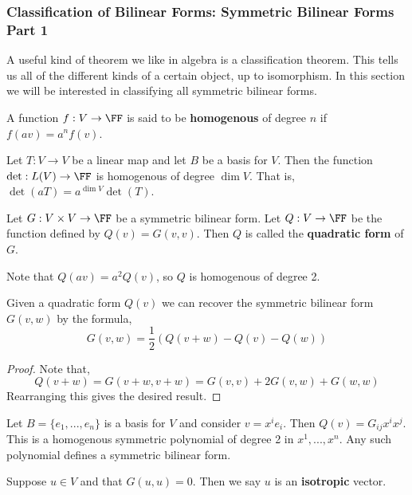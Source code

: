 \subsubsection{Classification of Bilinear Forms: Symmetric Bilinear Forms Part 1}
A useful kind of theorem we like in algebra is a classification theorem. This tells us all of the different kinds of a certain object, up to isomorphism. In this section we will be interested in classifying all symmetric bilinear forms.
\begin{defn}A function $f : V \to \FF$ is said to be \textbf{homogenous} of degree $n$ if $f(av) = a^n f(v)$.
\end{defn}
\begin{remark*}
    Let $T:V\to V$ be a linear map and let $B$ be a basis for $V$. Then the function $\det : L(V) \to \FF$ is homogenous of degree $\dim V$. That is, $\det (aT) = a^{\dim V} \det(T)$. 
\end{remark*}
\begin{defn}
    Let $G :V\times V \to \FF$ be a symmetric bilinear form. Let $Q : V\to \FF$ be the function defined by $Q(v) = G(v,v)$. Then $Q$ is called the \textbf{quadratic form} of $G$.
\end{defn}
\begin{remark*}
    Note that $Q(av) = a^2 Q(v)$, so $Q$ is homogenous of degree 2.
\end{remark*}

\begin{thm}
    Given a quadratic form $Q(v)$ we can recover the symmetric bilinear form $G(v,w)$ by the formula,
    \begin{equation}
        G(v,w) = \frac{1}{2}(Q(v+w)-Q(v)-Q(w))
    \end{equation}
\end{thm}
\begin{proof}
    Note that,
    \begin{equation}
        Q(v+w) = G(v+w,v+w) = G(v,v) + 2G(v,w) + G(w,w)
    \end{equation}
    Rearranging this gives the desired result.
\end{proof}
\begin{remark*}
    Let $B=\{e_1,...,e_n\}$ is a basis for $V$ and consider $v = x^i e_i$. Then $Q(v) = G_{ij} x^i x^j$. This is a homogenous symmetric polynomial of degree 2 in $x^1,...,x^n$. Any such polynomial defines a symmetric bilinear form.
\end{remark*}
\begin{defn}
    Suppose $u \in V$ and that $G(u,u)=0$. Then we say $u$ is an \textbf{isotropic} vector. 
\end{defn}


